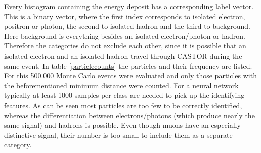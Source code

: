 Every histogram containing the energy deposit has a corresponding label vector. This is a binary vector, where the first index corresponds to isolated electron, positron or photon, the second to isolated hadron and the third to background. Here background is everything besides an isolated electron/photon or hadron. Therefore the categories do not exclude each other, since it is possible that an isolated electron and an isolated hadron travel through CASTOR during the same event. In table \ref{particlecounts} the particles and their frequency are listed. For this 500.000 Monte Carlo events were evaluated and only those particles with the beforementioned minimum distance were counted. For a neural network typically at least 1000 samples per class are needed to pick up the identifying features. As can be seen most particles are too few to be correctly identified, whereas the differentiation between electrons/photons (which produce nearly the same signal) and hadrons is possible. Even though muons have an especially distinctive signal, their number is too small to include them as a separate category.


